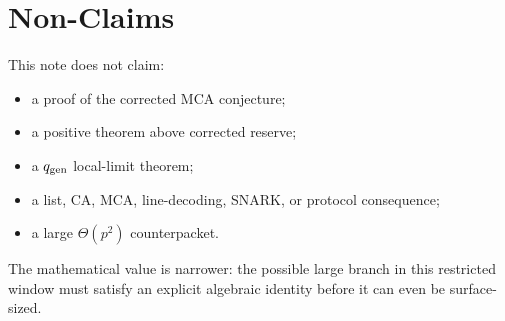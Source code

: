 \documentclass[11pt]{article}
\newcommand{\qgen}{q_{\rm gen}}
\begin{document}
\section{Non-Claims}

This note does not claim:
\begin{itemize}
\item a proof of the corrected MCA conjecture;
\item a positive theorem above corrected reserve;
\item a \(\qgen\) local-limit theorem;
\item a list, CA, MCA, line-decoding, SNARK, or protocol consequence;
\item a large \(\Theta(p^2)\) counterpacket.
\end{itemize}

The mathematical value is narrower: the possible large branch in this
restricted window must satisfy an explicit algebraic identity before it can
even be surface-sized.
\end{document}
